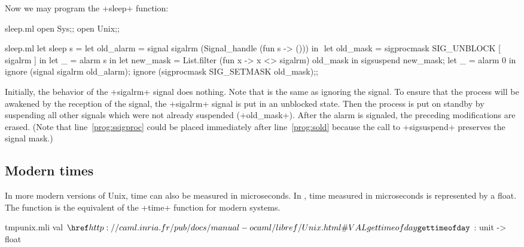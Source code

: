 \begin{example} Now we may program the \ml+sleep+ function:
%
\begin{codefile}{sleep.ml}
open Sys;;
open Unix;;
\end{codefile}
%
\begin{listingcodefile}[style=numbers]{sleep.ml}
let sleep s = 
  let old_alarm = signal sigalrm (Signal_handle (fun s -> ())) in $\label{prog:sold}$
  let old_mask = sigprocmask SIG_UNBLOCK [ sigalrm ] in
  let _ = alarm s in
  let new_mask = List.filter (fun x -> x <> sigalrm) old_mask in
  sigsuspend new_mask; 
  let _ = alarm 0 in
  ignore (signal sigalrm old_alarm); 
  ignore (sigprocmask SIG_SETMASK old_mask)$\label{prog:ssigproc}$;;
\end{listingcodefile}
%
Initially, the behavior of the \ml+sigalrm+ signal does nothing.  Note
that  is the same as ignoring the signal.  To
ensure that the process will be awakened by the reception
of the signal, the \ml+sigalrm+ signal is put in an unblocked
state.  Then the process is put on standby by suspending all other
signals which were not already suspended (\ml+old_mask+). After the alarm
is signaled, the preceding modifications are erased. (Note that
line~\ref{prog:ssigproc} could be placed immediately after
line~\ref{prog:sold} because the call to \ml+sigsuspend+ preserves
the signal mask.)

\end{example}

\subsection*{Modern times}

In more modern versions of Unix, time can also be measured in microseconds.
In {\ocaml}, time measured in microseconds is represented by a float.  
The  function is the equivalent of the \ml+time+ 
function for modern systems.

%
\begin{listingcodefile}{tmpunix.mli}
val $\libvalue{Unix}{gettimeofday}$ : unit -> float
\end{listingcodefile}


